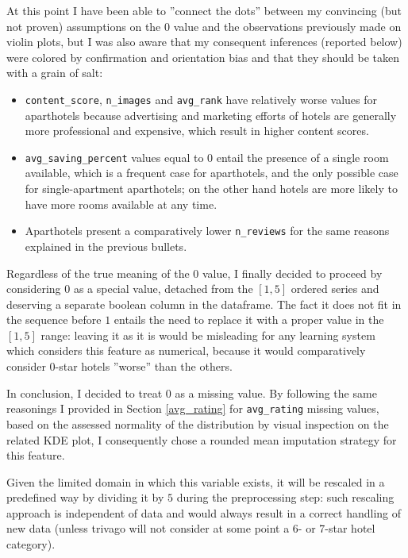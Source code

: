 \documentclass[preprint,12pt,3p]{elsarticle}
\begin{document}
At this point I have been able to ''connect the dots'' between my convincing (but not proven) assumptions on the $0$ value and the observations previously made on violin plots, but I was also aware that my consequent inferences (reported below) were colored by confirmation and orientation bias and that they should be taken with a grain of salt:
\begin{itemize}
	\item \verb|content_score|, \verb|n_images| and \verb|avg_rank| have relatively worse values for aparthotels because advertising and marketing efforts of hotels are generally more professional and expensive, which result in higher content scores.
	\item \verb|avg_saving_percent| values equal to $0$ entail the presence of a single room available, which is a frequent case for aparthotels, and the only possible case for single-apartment aparthotels; on the other hand hotels are more likely to have more rooms available at any time.
	\item Aparthotels present a comparatively lower \verb|n_reviews| for the same reasons explained in the previous bullets.
\end{itemize}

Regardless of the true meaning of the $0$ value, I finally decided to proceed by considering $0$ as a special value, detached from the $[1,5]$ ordered series and deserving a separate boolean column in the dataframe. The fact it does not fit in the sequence before $1$ entails the need to replace it with a proper value in the $[1,5]$ range: leaving it as it is would be misleading for any learning system which considers this feature as numerical, because it would comparatively consider $0$-star hotels ''worse'' than the others. 

In conclusion, I decided to treat $0$ as a missing value. By following the same reasonings I provided in Section \ref{avg_rating} for \verb|avg_rating| missing values, based on the assessed normality of the distribution by visual inspection on the related KDE plot, I consequently chose a rounded mean imputation strategy for this feature.

Given the limited domain in which this variable exists, it will be rescaled in a predefined way by dividing it by $5$ during the preprocessing step: such rescaling approach is independent of data and would always result in a correct handling of new data (unless trivago will not consider at some point a 6- or 7-star hotel category).
\end{document}
